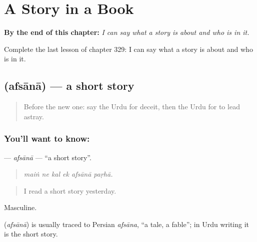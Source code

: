 
\chapter{A Story in a Book}
\label{ch:ur-a-story-in-a-book}

\begin{chapteropening}
\textbf{By the end of this chapter:} \emph{I can say what a story is about and who is in it.}

Complete the last lesson of chapter 329: I can say what a story is about and who is in it.
\end{chapteropening}

\section[\texorpdfstring{\ur{افسانہ} (afsānā)}{افسانہ (afsānā)}]{ (afsānā) — a short story}

\label{lesson:UR-C329-afsana}



\begin{quote}
Before the new one: say the Urdu for deceit, then the Urdu for to lead astray.
\end{quote}

\subsection*{You'll want to know: }
\textbf{} — \emph{afsānā} — \textquotedblleft{}a short story\textquotedblright{}.

\begin{quote}
     
\end{quote}

\begin{quote}
\emph{maiṅ ne kal ek afsānā paṛhā.}
\end{quote}

\begin{quote}
I read a short story yesterday.
\end{quote}

Masculine.

\begin{cousinweb}
\textbf{} (\emph{afsānā}) is usually traced to Persian \emph{afsāna}, \textquotedblleft{}a tale, a fable\textquotedblright{}; in Urdu writing it is the short story.
\end{cousinweb}


